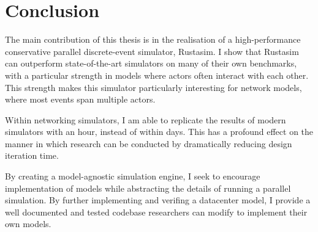\chapter{Conclusion} \label{conclusion}

The main contribution of this thesis is in the realisation of a high-performance conservative parallel discrete-event simulator, Rustasim.
I show that Rustasim can outperform state-of-the-art simulators on many of their own benchmarks, with a particular strength in models where actors often interact with each other.
This strength makes this simulator particularly interesting for network models, where most events span multiple actors.

Within networking simulators, I am able to replicate the results of modern simulators with an hour, instead of within days.
This has a profound effect on the manner in which research can be conducted by dramatically reducing design iteration time.

By creating a model-agnostic simulation engine, I seek to encourage implementation of models while abstracting the details of running a parallel simulation.
By further implementing and verifing a datacenter model, I provide a well documented and tested codebase researchers can modify to implement their own models.
